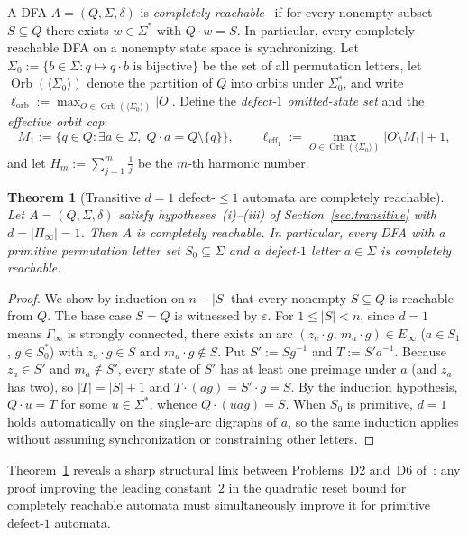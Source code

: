 \documentclass[11pt,a4paper]{article}
\newtheorem{theorem}{Theorem}[section]
\theoremstyle{definition}
\theoremstyle{remark}
\newcommand{\Orb}{\operatorname{Orb}}
\newcommand{\leff}{\ell_{\mathrm{eff}_1}}
\newcommand{\lorb}{\ell_{\mathrm{orb}}}
\begin{document}
A DFA $A = (Q, \Sigma, \delta)$ is \emph{completely reachable}~\cite{BV2016} if for every nonempty subset $S \subseteq Q$ there exists $w \in \Sigma^*$ with $Q \cdot w = S$. In particular, every completely reachable DFA on a nonempty state space is synchronizing. Let $\Sigma_0 := \{b \in \Sigma : q \mapsto q \cdot b \text{ is bijective}\}$ be the set of all permutation letters, let $\Orb(\langle \Sigma_0 \rangle)$ denote the partition of $Q$ into orbits under $\Sigma_0^*$, and write $\lorb := \max_{O \in \Orb(\langle \Sigma_0 \rangle)} |O|$. Define the \emph{defect-$1$ omitted-state set} and the \emph{effective orbit cap}:
\[
  M_1 := \{q \in Q : \exists a \in \Sigma,\; Q \cdot a = Q \setminus \{q\}\}, \qquad
  \leff := \max_{O \in \Orb(\langle \Sigma_0 \rangle)} |O \setminus M_1| + 1,
\]
and let $H_m := \sum_{j = 1}^m \frac{1}{j}$ be the $m$-th harmonic number.

\begin{theorem}[Transitive $d = 1$ defect-$\le 1$ automata are completely reachable]\label{thm:d6-subset-cr}
Let $A = (Q, \Sigma, \delta)$ satisfy hypotheses~\textup{(i)--(iii)} of Section~\ref{sec:transitive} with $d = |\Pi_\infty| = 1$. Then $A$ is completely reachable. In particular, every DFA with a primitive permutation letter set $S_0 \subseteq \Sigma$ and a defect-$1$ letter $a \in \Sigma$ is completely reachable.
\end{theorem}

\begin{proof}
We show by induction on $n - |S|$ that every nonempty $S \subseteq Q$ is reachable from $Q$. The base case $S = Q$ is witnessed by $\varepsilon$. For $1 \le |S| < n$, since $d = 1$ means $\Gamma_\infty$ is strongly connected, there exists an arc $(z_a \cdot g,\, m_a \cdot g) \in E_\infty$ ($a \in S_1$, $g \in S_0^*$) with $z_a \cdot g \in S$ and $m_a \cdot g \notin S$. Put $S' := S g^{-1}$ and $T := S' a^{-1}$. Because $z_a \in S'$ and $m_a \notin S'$, every state of $S'$ has at least one preimage under $a$ (and $z_a$ has two), so $|T| = |S| + 1$ and $T \cdot (ag) = S' \cdot g = S$. By the induction hypothesis, $Q \cdot u = T$ for some $u \in \Sigma^*$, whence $Q \cdot (uag) = S$. When $S_0$ is primitive, $d = 1$ holds automatically on the single-arc digraphs of $a$, so the same induction applies without assuming synchronization or constraining other letters.
\end{proof}

Theorem~\ref{thm:d6-subset-cr} reveals a sharp structural link between Problems~D2 and~D6 of~\cite{Volkov2026}: any proof improving the leading constant~$2$ in the quadratic reset bound for completely reachable automata must simultaneously improve it for primitive defect-$1$ automata.
\end{document}
